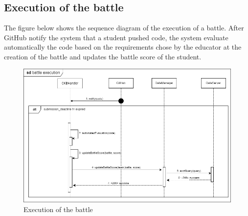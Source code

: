 \subsection{Execution of the battle}
The figure below shows the sequence diagram of the execution of a battle. After GitHub notify the system that a student pushed code, the system
evaluate automatically the code based on the requirements chose by the educator at the creation of the battle and
updates the battle score of the student.
\begin{figure}[H]
    \centering
    \includegraphics[width=1\textwidth]{images/seq_diagrams/battle_execution_DD.png}
    \caption{Execution of the battle}
\end{figure}

